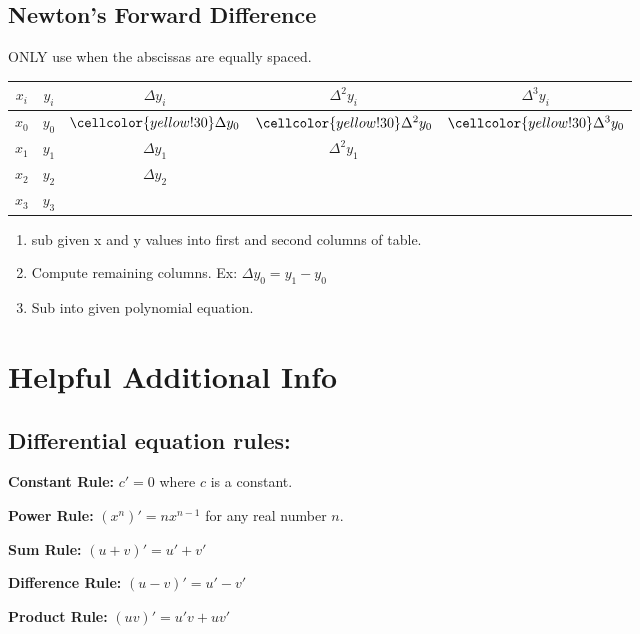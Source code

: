 \documentclass[10pt]{article}
\begin{document}
\begin{multicols}{2}
\subsection*{Newton's Forward Difference}
ONLY use when the abscissas are equally spaced.\\

\begin{tabular}{ c c c c c }
    $ x_{i} $ & $ y_{i} $ & $ \Delta y_{i} $ & $ \Delta^{2} y_{i} $ & $ \Delta^{3} y_{i} $ \\
    \hline
    $ x_{0} $ & $ y_{0} $ & $ \cellcolor{yellow!30} \Delta y_{0} $ & $ \cellcolor{yellow!30} \Delta^{2} y_{0} $  & $ \cellcolor{yellow!30} \Delta^{3} y_{0} $ \\
    $ x_{1} $ & $ y_{1} $ & $ \Delta y_{1} $ & $ \Delta^{2} y_{1} $ & \\
    $ x_{2} $ & $ y_{2} $ & $ \Delta y_{2} $ & & \\
    $ x_{3} $ & $ y_{3} $ & & & \\
\end{tabular}

\begin{enumerate}
    \item sub given x and y values into first and second columns of table.
    \item Compute remaining columns. Ex: $ \Delta y_{0} =  y_{1} - y_{0} $
    \item Sub into given polynomial equation.
\end{enumerate}


\end{multicols}

\pagebreak
\section*{Helpful Additional Info}

\subsection{Differential equation rules:}

\textbf{Constant Rule:} \( c' = 0 \) where \( c \) is a constant.

\textbf{Power Rule:} \( (x^n)' = nx^{n-1} \) for any real number \( n \).

\textbf{Sum Rule:} \( (u + v)' = u' + v' \)

\textbf{Difference Rule:} \( (u - v)' = u' - v' \)

\textbf{Product Rule:} \( (uv)' = u'v + uv' \)
\end{document}
